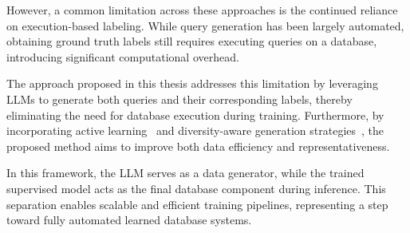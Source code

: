 However, a common limitation across these approaches is the continued reliance on execution-based labeling. While query generation has been largely automated, obtaining ground truth labels still requires executing queries on a database, introducing significant computational overhead.

The approach proposed in this thesis addresses this limitation by leveraging LLMs to generate both queries and their corresponding labels, thereby eliminating the need for database execution during training. Furthermore, by incorporating active learning~\cite{DBLP:journals/tnn/LiWCJDO25} and diversity-aware generation strategies~\cite{DBLP:journals/corr/abs-2503-24228}, the proposed method aims to improve both data efficiency and representativeness.

In this framework, the LLM serves as a data generator, while the trained supervised model acts as the final database component during inference. This separation enables scalable and efficient training pipelines, representing a step toward fully automated learned database systems.